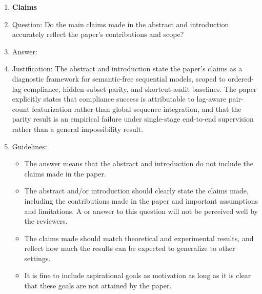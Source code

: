 \documentclass{article}
\theoremstyle{plain}
\theoremstyle{definition}
\theoremstyle{remark}
\begin{document}
\begin{enumerate}

\item {\bf Claims}
    \item[] Question: Do the main claims made in the abstract and introduction accurately reflect the paper's contributions and scope?
    \item[] Answer: \answerYes{}
    \item[] Justification: The abstract and introduction state the paper's claims as a diagnostic framework for semantic-free sequential models, scoped to ordered-lag compliance, hidden-subset parity, and shortcut-audit baselines. The paper explicitly states that compliance success is attributable to lag-aware pair-count featurization rather than global sequence integration, and that the parity result is an empirical failure under single-stage end-to-end supervision rather than a general impossibility result.
    \item[] Guidelines:
    \begin{itemize}
        \item The answer \answerNA{} means that the abstract and introduction do not include the claims made in the paper.
        \item The abstract and/or introduction should clearly state the claims made, including the contributions made in the paper and important assumptions and limitations. A \answerNo{} or \answerNA{} answer to this question will not be perceived well by the reviewers. 
        \item The claims made should match theoretical and experimental results, and reflect how much the results can be expected to generalize to other settings. 
        \item It is fine to include aspirational goals as motivation as long as it is clear that these goals are not attained by the paper. 
    \end{itemize}


\end{enumerate}
\end{document}
